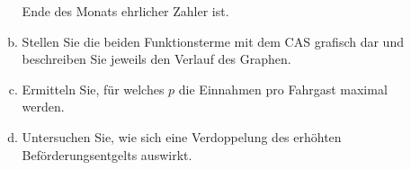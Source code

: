 \begin{exercise}
\begin{enumerate}[1)]
\begin{enumerate}[a)]
                    Ende des Monats ehrlicher Zahler ist.
              \item Stellen Sie die beiden Funktionsterme mit dem CAS grafisch
                    dar und beschreiben Sie jeweils den Verlauf des Graphen.
              \item Ermitteln Sie, für welches $p$ die Einnahmen pro Fahrgast
                    maximal werden.
              \item Untersuchen Sie, wie sich eine Verdoppelung des
                    \glqq erhöhten Beförderungsentgelts\grqq{} auswirkt.
            \end{enumerate}
    \end{enumerate}
  \fi
\end{exercise}
